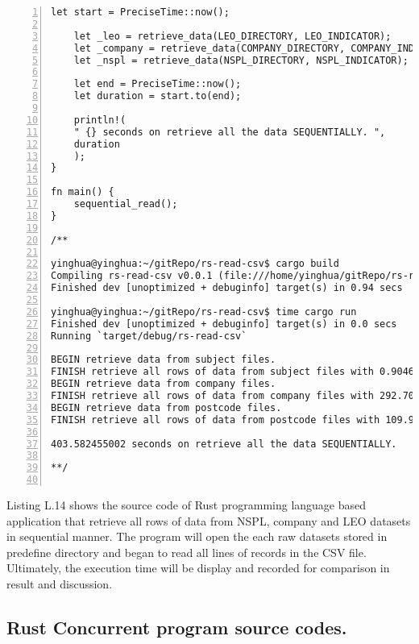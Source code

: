 \begin{lstlisting}[breaklines, frame=single, numbers=left, caption={Rust sequential program source codes. (main.rs)}, label=commandline-02]
	let start = PreciseTime::now();
	
	let _leo = retrieve_data(LEO_DIRECTORY, LEO_INDICATOR);
	let _company = retrieve_data(COMPANY_DIRECTORY, COMPANY_INDICATOR);
	let _nspl = retrieve_data(NSPL_DIRECTORY, NSPL_INDICATOR);
	
	let end = PreciseTime::now();
	let duration = start.to(end);
	
	println!(
	" {} seconds on retrieve all the data SEQUENTIALLY. ",
	duration
	);
}

fn main() {
	sequential_read();
}

/** 

yinghua@yinghua:~/gitRepo/rs-read-csv$ cargo build 
Compiling rs-read-csv v0.0.1 (file:///home/yinghua/gitRepo/rs-read-csv)
Finished dev [unoptimized + debuginfo] target(s) in 0.94 secs

yinghua@yinghua:~/gitRepo/rs-read-csv$ time cargo run 
Finished dev [unoptimized + debuginfo] target(s) in 0.0 secs
Running `target/debug/rs-read-csv`

BEGIN retrieve data from subject files. 
FINISH retrieve all rows of data from subject files with 0.904617367 seconds.
BEGIN retrieve data from company files. 
FINISH retrieve all rows of data from company files with 292.704881750 seconds.
BEGIN retrieve data from postcode files. 
FINISH retrieve all rows of data from postcode files with 109.972792579 seconds.

403.582455002 seconds on retrieve all the data SEQUENTIALLY. 

**/ 


\end{lstlisting}

Listing L.14 shows the source code of Rust programming language based application that retrieve all rows of data from NSPL, company and LEO datasets in sequential manner. The program will open the each raw datasets stored in predefine directory and began to read all lines of records in the CSV file. Ultimately, the execution time will be display and recorded for comparison in result and discussion. 

\newpage

\subsection{Rust Concurrent program source codes.}

